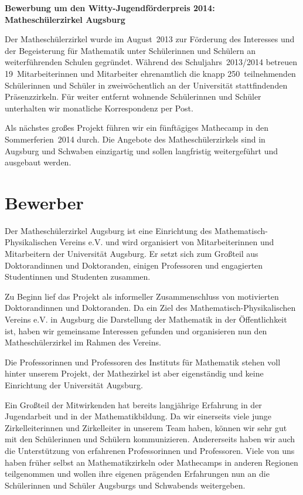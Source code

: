 \documentclass[12pt]{zettel}
\begin{document}
\pagestyle{plain}

\renewcommand{\betreff}{}

\makeletterhead{}

\vspace{-2em}

\begin{center}
  \Large\textbf{\textsf{Bewerbung um den Witty-Jugendförderpreis 2014: \\
  Matheschülerzirkel Augsburg}}
\end{center}

Der Matheschülerzirkel wurde im August~2013 zur Förderung des
Interesses und der Begeisterung für Mathematik unter Schülerinnen und Schülern
an weiterführenden Schulen gegründet. Während des Schuljahrs~2013/2014 betreuen
19~Mitarbeiterinnen und Mitarbeiter ehrenamtlich die knapp
250~teilnehmenden Schülerinnen und Schüler in zweiwöchentlich an der
Universität stattfindenden Präsenzzirkeln. Für weiter entfernt wohnende Schülerinnen
und Schüler unterhalten wir monatliche Korrespondenz per Post.

Als nächstes großes Projekt führen wir ein fünftägiges Mathecamp in den
Sommerferien~2014 durch. Die Angebote des Matheschülerzirkels sind in Augsburg
und Schwaben einzigartig und sollen langfristig weitergeführt und ausgebaut
werden.

\section{Bewerber}

Der Matheschülerzirkel Augsburg ist eine Einrichtung des
Mathematisch-Phy\-si\-ka\-li\-schen Vereins e.V. und wird organisiert von
Mitarbeiterinnen und Mitarbeitern der Universität
Augsburg. Er setzt sich zum Großteil aus Doktorandinnen und Doktoranden,
einigen Professoren und engagierten Studentinnen und Studenten zusammen.

Zu Beginn lief das Projekt als informeller Zusammenschluss von motivierten Doktorandinnen und Doktoranden. Da ein Ziel des Mathematisch-Physikalischen Vereins e.V. in Augsburg die Darstellung der Mathematik in der Öffentlichkeit ist, haben wir gemeinsame Interessen gefunden und organisieren nun den Matheschülerzirkel im Rahmen des Vereins.

Die Professorinnen und Professoren des Instituts für Mathematik stehen voll hinter unserem Projekt, der Mathezirkel ist aber eigenständig und keine Einrichtung der Universität Augsburg.

Ein Großteil der Mitwirkenden hat bereits langjährige Erfahrung in
der Jugendarbeit und in der Mathematikbildung. Da wir
einerseits viele junge Zirkelleiterinnen und Zirkelleiter in unserem Team haben, können wir
sehr gut mit den Schülerinnen und Schülern kommunizieren.
Andererseits haben wir auch die Unterstützung von erfahrenen Professorinnen und Professoren. Viele von uns haben früher selbst an Mathematikzirkeln oder Mathecamps in anderen Regionen teilgenommen und wollen ihre eigenen prägenden Erfahrungen nun an die Schülerinnen und Schüler Augsburgs und Schwabends weitergeben.
\end{document}
